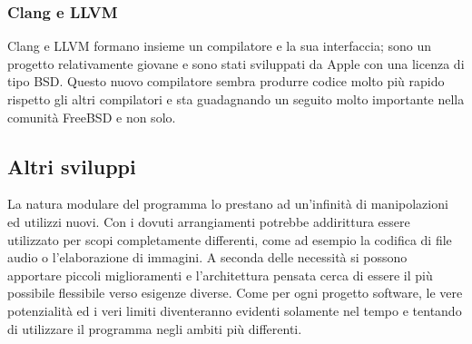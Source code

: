 \subsubsection{Clang e LLVM}
Clang e LLVM formano insieme un compilatore e la sua interfaccia; sono un
progetto relativamente giovane e sono stati sviluppati da Apple con una licenza
di tipo BSD. Questo nuovo compilatore sembra produrre codice molto più rapido
rispetto gli altri compilatori e sta guadagnando un seguito molto importante
nella comunit\`a FreeBSD e non solo.

\subsection{Altri sviluppi}
La natura modulare del programma lo prestano ad un'infinit\`a di manipolazioni
ed utilizzi nuovi. Con i dovuti arrangiamenti potrebbe addirittura essere
utilizzato per scopi completamente differenti, come ad esempio la codifica di
file audio o l'elaborazione di immagini. A seconda delle necessit\`a si possono
apportare piccoli miglioramenti e l'architettura pensata cerca di essere il
pi\`u possibile flessibile verso esigenze diverse. Come per ogni progetto
software, le vere potenzialit\`a ed i veri limiti diventeranno evidenti
solamente nel tempo e tentando di utilizzare il programma negli ambiti pi\`u
differenti.

